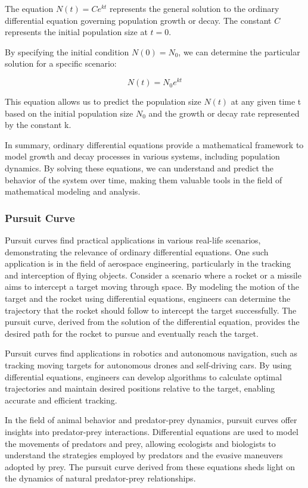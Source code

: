 \documentclass[13pt,a4paper]{report}
\begin{document}
The equation $N(t) = Ce^{kt}$ represents the general solution to the ordinary differential equation governing population growth or decay. The constant $C$ represents the initial population size at $t = 0$.

By specifying the initial condition $N(0) = N_0$, we can determine the particular solution for a specific scenario:

$$N(t) = N_0 e^{kt}$$

This equation allows us to predict the population size $N(t)$ at any given time t based on the initial population size $N_0$ and the growth or decay rate represented by the constant k.

In summary, ordinary differential equations provide a mathematical framework to model growth and decay processes in various systems, including population dynamics. By solving these equations, we can understand and predict the behavior of the system over time, making them valuable tools in the field of mathematical modeling and analysis.

\subsubsection{Pursuit Curve}

Pursuit curves find practical applications in various real-life scenarios, demonstrating the relevance of ordinary differential equations. One such application is in the field of aerospace engineering, particularly in the tracking and interception of flying objects. Consider a scenario where a rocket or a missile aims to intercept a target moving through space. By modeling the motion of the target and the rocket using differential equations, engineers can determine the trajectory that the rocket should follow to intercept the target successfully. The pursuit curve, derived from the solution of the differential equation, provides the desired path for the rocket to pursue and eventually reach the target.

Pursuit curves find applications in robotics and autonomous navigation, such as tracking moving targets for autonomous drones and self-driving cars. By using differential equations, engineers can develop algorithms to calculate optimal trajectories and maintain desired positions relative to the target, enabling accurate and efficient tracking.

In the field of animal behavior and predator-prey dynamics, pursuit curves offer insights into predator-prey interactions. Differential equations are used to model the movements of predators and prey, allowing ecologists and biologists to understand the strategies employed by predators and the evasive maneuvers adopted by prey. The pursuit curve derived from these equations sheds light on the dynamics of natural predator-prey relationships.
\end{document}
